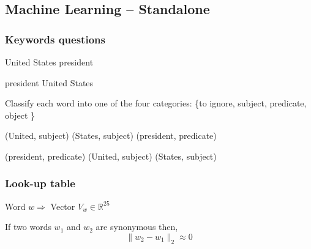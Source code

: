 \subsection{Machine Learning \--- Standalone}

\begin{frame}[fragile]
  \frametitle{Keywords questions}

	
	\begin{center}
  	\alert{United States president}
	\end{center}

	\begin{center}
  	\alert{president United States}
	\end{center}

\end{frame}

\begin{frame}[fragile]

Classify each word into one of the four categories: \{to ignore, subject, predicate, object \}

\end{frame}

\begin{frame}[fragile]

	\begin{center}
  	\alert{(United, subject) (States, subject) (president, predicate)}
	\end{center}

	\begin{center}
  	\alert{(president, predicate) (United, subject) (States, subject)}
	\end{center}



\end{frame}

\begin{frame}[fragile]
  \frametitle{Look-up table}

	\begin{center}
	Word $w \Rightarrow $ Vector $ V_w \in \mathbb{R}^{25}$
	\end{center}

	\begin{center}
	If two words $w_1$ and $w_2$ are synonymous then, \newline
	$$ \| w_2 - w_1 \|_2 \approx 0 $$
	
	\end{center}



\end{frame}



